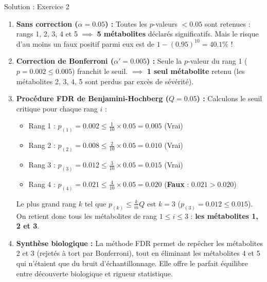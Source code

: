 \documentclass[11pt,a4paper]{article}
\begin{document}
\begin{solutionbox}{Solution : Exercice 2}
\begin{enumerate}[label=\textbf{\alph*.}]
  \item \textbf{Sans correction ($\alpha = 0.05$) :}
  Toutes les $p$-valeurs $< 0.05$ sont retenues : rangs 1, 2, 3, 4 et 5 $\implies$ \textbf{5 métabolites} déclarés significatifs. Mais le risque d'au moins un faux positif parmi eux est de $1 - (0.95)^{10} = \mathbf{40.1\%}$ !
  \item \textbf{Correction de Bonferroni ($\alpha' = 0.005$) :}
  Seule la $p$-valeur du rang 1 ($p = 0.002 \le 0.005$) franchit le seuil.
  $\implies$ \textbf{1 seul métabolite} retenu (les métabolites 2, 3, 4, 5 sont perdus par excès de sévérité).
  \item \textbf{Procédure FDR de Benjamini-Hochberg ($Q = 0.05$) :}
  Calculons le seuil critique pour chaque rang $i$ :
  \begin{itemize}
    \item Rang 1 : $p_{(1)} = 0.002 \le \frac{1}{10} \times 0.05 = \mathbf{0.005}$ \quad (Vrai)
    \item Rang 2 : $p_{(2)} = 0.008 \le \frac{2}{10} \times 0.05 = \mathbf{0.010}$ \quad (Vrai)
    \item Rang 3 : $p_{(3)} = 0.012 \le \frac{3}{10} \times 0.05 = \mathbf{0.015}$ \quad (Vrai)
    \item Rang 4 : $p_{(4)} = 0.021 \le \frac{4}{10} \times 0.05 = \mathbf{0.020}$ \quad (\textbf{Faux} : $0.021 > 0.020$)
  \end{itemize}
  Le plus grand rang $k$ tel que $p_{(k)} \le \frac{k}{m} Q$ est \textbf{$k = 3$} ($p_{(3)} = 0.012 \le 0.015$).
  On retient donc tous les métabolites de rang $1 \le i \le 3$ : \textbf{les métabolites 1, 2 et 3}.
  \item \textbf{Synthèse biologique :}
  La méthode FDR permet de repêcher les métabolites 2 et 3 (rejetés à tort par Bonferroni), tout en éliminant les métabolites 4 et 5 qui n'étaient que du bruit d'échantillonnage. Elle offre le parfait équilibre entre découverte biologique et rigueur statistique.
\end{enumerate}
\end{solutionbox}
\end{document}
